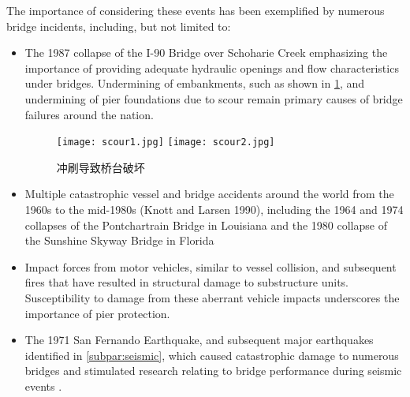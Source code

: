 The importance of considering these events has been exemplified by numerous bridge incidents, including, but not limited to:
\begin{itemize}
  \item The 1987 collapse of the I-90 Bridge over Schoharie Creek emphasizing the importance of providing adequate hydraulic openings and flow characteristics under bridges. Undermining of embankments, such as
  shown in \cref{fig:scour-undermining-abutment}, and undermining of pier foundations due to scour remain primary causes of bridge
  failures around the nation.
  \begin{figure}
    \texttt{[image: scour1.jpg]}\hfill
    \texttt{[image: scour2.jpg]}
    \caption{冲刷导致桥台破坏}
    \label{fig:scour-undermining-abutment}
  \end{figure}
  \item  Multiple catastrophic vessel and bridge accidents around the world from the 1960s to the mid-1980s (Knott and Larsen 1990), including the 1964 and 1974 collapses of the Pontchartrain Bridge in Louisiana and the 1980 collapse of the Sunshine Skyway Bridge in Florida
  \item Impact forces from motor vehicles, similar to vessel collision, and subsequent fires that have resulted in structural damage to substructure units. Susceptibility to damage from these aberrant vehicle impacts
  underscores the importance of pier protection.
  \item The 1971 San Fernando Earthquake, and subsequent major earthquakes identified in \cref{subpar:seismic}, which caused catastrophic damage to numerous bridges and stimulated research relating to bridge performance during seismic events \cite{aashto1983s}.
\end{itemize}

